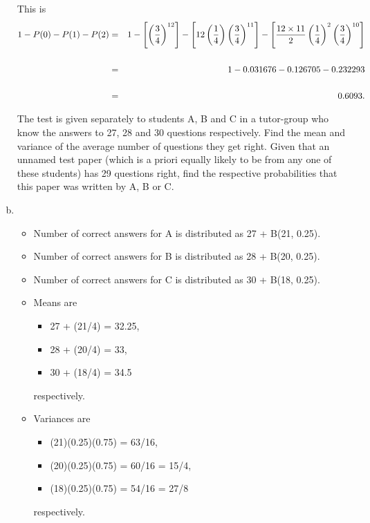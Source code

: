 \documentclass[a4paper,12pt]{article}
\begin{document}
\begin{enumerate}[(a)]
This is
\begin{eqnarray*}
1 - P(0) - P(1) - P(2) &=& 1- \left[\left(\frac{3}{4}\right)^{12}\right] - \left[12\left(\frac{1}{4}\right) \left(\frac{3}{4}\right)^{11} \right] - \left[\frac{12 \times 11}{2} \left(\frac{1}{4}\right)^{2} \left(\frac{3}{4}\right)^{10}\right]\\ \\ \bigskip
&=& 1- 0.031676 - 0.126705 - 0.232293 \\ \\ \smallskip
&=& 0.6093 .
\end{eqnarray*}

\newpage

\begin{framed}
The test is given separately to students A, B and C in a tutor-group who know
the answers to 27, 28 and 30 questions respectively. Find the mean and
variance of the average number of questions they get right. Given that an
unnamed test paper (which is a priori equally likely to be from any one of
these students) has 29 questions right, find the respective probabilities that this
paper was written by A, B or C.

\end{framed}

\item 
\begin{itemize}
\item Number of correct answers for A is distributed as 27 + B(21, 0.25).
\item Number of correct answers for B is distributed as 28 + B(20, 0.25).
\item Number of correct answers for C is distributed as 30 + B(18, 0.25).
\end{itemize}
\begin{itemize}
\item Means are 
\begin{itemize}
\item 27 + (21/4) = 32.25, 
\item 28 + (20/4) = 33, 
\item 30 + (18/4) = 34.5
\end{itemize}  
respectively.

\item  Variances are 
\begin{itemize}
\item (21)(0.25)(0.75) = 63/16, 
\item (20)(0.25)(0.75) = 60/16 = 15/4, 
\item (18)(0.25)(0.75) = 54/16 = 27/8 
\end{itemize}  
  respectively.
 

\end{itemize}
\end{enumerate}
\end{document}
